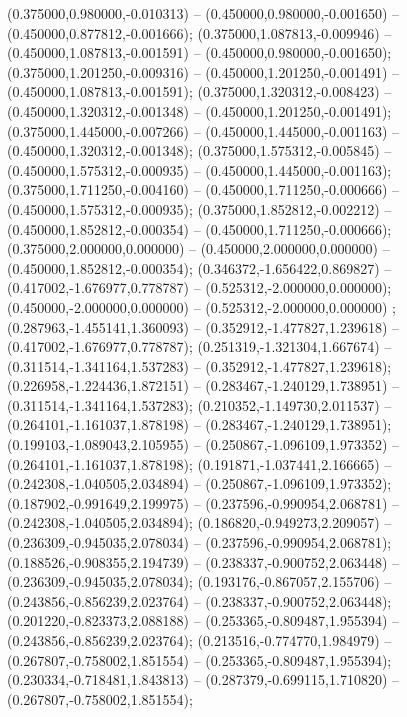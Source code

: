 (0.375000,0.980000,-0.010313) -- (0.450000,0.980000,-0.001650) -- (0.450000,0.877812,-0.001666);
 (0.375000,1.087813,-0.009946) -- (0.450000,1.087813,-0.001591) -- (0.450000,0.980000,-0.001650);
 (0.375000,1.201250,-0.009316) -- (0.450000,1.201250,-0.001491) -- (0.450000,1.087813,-0.001591);
 (0.375000,1.320312,-0.008423) -- (0.450000,1.320312,-0.001348) -- (0.450000,1.201250,-0.001491);
 (0.375000,1.445000,-0.007266) -- (0.450000,1.445000,-0.001163) -- (0.450000,1.320312,-0.001348);
 (0.375000,1.575312,-0.005845) -- (0.450000,1.575312,-0.000935) -- (0.450000,1.445000,-0.001163);
 (0.375000,1.711250,-0.004160) -- (0.450000,1.711250,-0.000666) -- (0.450000,1.575312,-0.000935);
 (0.375000,1.852812,-0.002212) -- (0.450000,1.852812,-0.000354) -- (0.450000,1.711250,-0.000666);
 (0.375000,2.000000,0.000000) -- (0.450000,2.000000,0.000000) -- (0.450000,1.852812,-0.000354);
 (0.346372,-1.656422,0.869827) -- (0.417002,-1.676977,0.778787) -- (0.525312,-2.000000,0.000000);
 (0.450000,-2.000000,0.000000) -- (0.525312,-2.000000,0.000000) ;
 (0.287963,-1.455141,1.360093) -- (0.352912,-1.477827,1.239618) -- (0.417002,-1.676977,0.778787);
 (0.251319,-1.321304,1.667674) -- (0.311514,-1.341164,1.537283) -- (0.352912,-1.477827,1.239618);
 (0.226958,-1.224436,1.872151) -- (0.283467,-1.240129,1.738951) -- (0.311514,-1.341164,1.537283);
 (0.210352,-1.149730,2.011537) -- (0.264101,-1.161037,1.878198) -- (0.283467,-1.240129,1.738951);
 (0.199103,-1.089043,2.105955) -- (0.250867,-1.096109,1.973352) -- (0.264101,-1.161037,1.878198);
 (0.191871,-1.037441,2.166665) -- (0.242308,-1.040505,2.034894) -- (0.250867,-1.096109,1.973352);
 (0.187902,-0.991649,2.199975) -- (0.237596,-0.990954,2.068781) -- (0.242308,-1.040505,2.034894);
 (0.186820,-0.949273,2.209057) -- (0.236309,-0.945035,2.078034) -- (0.237596,-0.990954,2.068781);
 (0.188526,-0.908355,2.194739) -- (0.238337,-0.900752,2.063448) -- (0.236309,-0.945035,2.078034);
 (0.193176,-0.867057,2.155706) -- (0.243856,-0.856239,2.023764) -- (0.238337,-0.900752,2.063448);
 (0.201220,-0.823373,2.088188) -- (0.253365,-0.809487,1.955394) -- (0.243856,-0.856239,2.023764);
 (0.213516,-0.774770,1.984979) -- (0.267807,-0.758002,1.851554) -- (0.253365,-0.809487,1.955394);
 (0.230334,-0.718481,1.843813) -- (0.287379,-0.699115,1.710820) -- (0.267807,-0.758002,1.851554);
